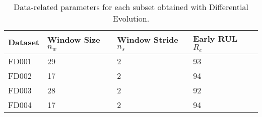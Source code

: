 \begin{table}[!htb]
\centering
\begin{tabular}{l l l l l}
	\hline
	 Dataset & Window Size $n_w$ & Window Stride $n_s$ & Early RUL $R_e$\\
  	\hline
  	FD001 & 29 & 2 & 93\\
  	FD002 & 17 & 2 & 94\\
  	FD003 & 28 & 2 & 92\\
  	FD004 & 17 & 2 & 94\\
  	\hline
\end{tabular}
\caption{Data-related parameters for each subset obtained with Differential Evolution.}
\label{table:optimal_data_params}
\end{table}